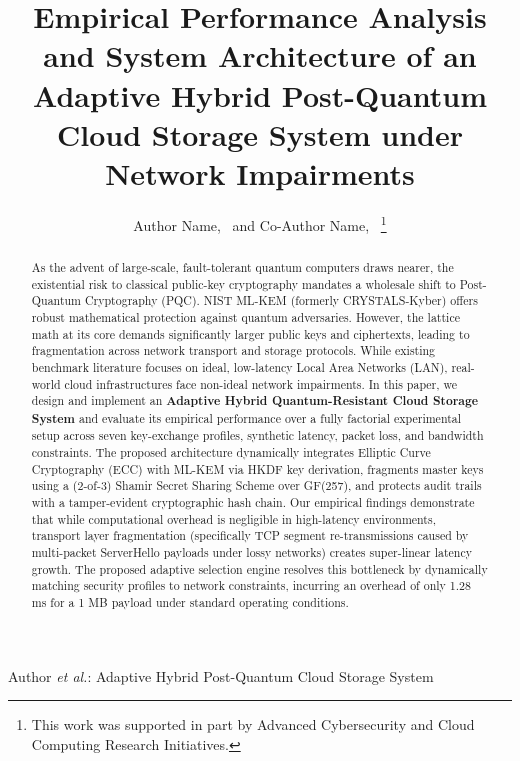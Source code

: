 \documentclass[journal,twoside]{IEEEtran}
\begin{document}
\title{Empirical Performance Analysis and System Architecture of an Adaptive Hybrid Post-Quantum Cloud Storage System under Network Impairments}

\author{Author Name,~ and Co-Author Name,~%
\thanks{This work was supported in part by Advanced Cybersecurity and Cloud Computing Research Initiatives.}}

%
{Author \MakeLowercase{\textit{et al.}}: Adaptive Hybrid Post-Quantum Cloud Storage System}

\maketitle

\begin{abstract}
As the advent of large-scale, fault-tolerant quantum computers draws nearer, the existential risk to classical public-key cryptography mandates a wholesale shift to Post-Quantum Cryptography (PQC). NIST ML-KEM (formerly CRYSTALS-Kyber) offers robust mathematical protection against quantum adversaries. However, the lattice math at its core demands significantly larger public keys and ciphertexts, leading to fragmentation across network transport and storage protocols. While existing benchmark literature focuses on ideal, low-latency Local Area Networks (LAN), real-world cloud infrastructures face non-ideal network impairments. In this paper, we design and implement an \textbf{Adaptive Hybrid Quantum-Resistant Cloud Storage System} and evaluate its empirical performance over a fully factorial experimental setup across seven key-exchange profiles, synthetic latency, packet loss, and bandwidth constraints. The proposed architecture dynamically integrates Elliptic Curve Cryptography (ECC) with ML-KEM via HKDF key derivation, fragments master keys using a (2-of-3) Shamir Secret Sharing Scheme over GF(257), and protects audit trails with a tamper-evident cryptographic hash chain. Our empirical findings demonstrate that while computational overhead is negligible in high-latency environments, transport layer fragmentation (specifically TCP segment re-transmissions caused by multi-packet ServerHello payloads under lossy networks) creates super-linear latency growth. The proposed adaptive selection engine resolves this bottleneck by dynamically matching security profiles to network constraints, incurring an overhead of only 1.28 ms for a 1 MB payload under standard operating conditions.
\end{abstract}
\end{document}
